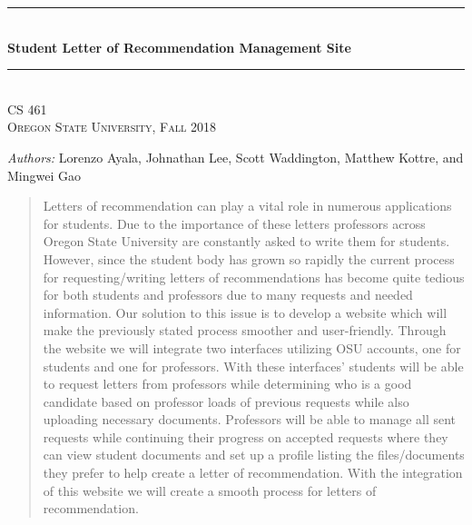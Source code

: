 \documentclass[onecolumn, draftclsnofoot,10pt, compsoc]{IEEEtran}
\begin{document}
\begin{titlepage}
    \newcommand{\HRule}{\rule{\linewidth}{0.5mm}}
    \center 
    \HRule \\[0.4cm]
    { \Large \bfseries Student Letter of Recommendation Management Site}\\[0.4cm] 
    \HRule \\[0.5cm]
    \center 
    \textsc{\Large CS 461}\\[0.5cm] 
    \textsc{\Large Oregon State University, Fall 2018}\\[0.5cm] 
    \begin{minipage}{0.4\textwidth}
        \begin{center} \large
        \emph{Authors:} Lorenzo Ayala, Johnathan Lee, Scott Waddington, Matthew Kottre, and Mingwei Gao
        \end{center}
    \end{minipage}
    \vspace{2cm}
    \begin{abstract}
   Letters of recommendation can play a vital role in numerous applications for students. Due to the importance of these letters professors across Oregon State University are constantly asked to write them for students. However, since the student body has grown so rapidly the current process for requesting/writing letters of recommendations has become quite tedious for both students and professors due to many requests and needed information.  Our solution to this issue is to develop a website which will make the previously stated process smoother and user-friendly. Through the website we will integrate two interfaces utilizing OSU accounts, one for students and one for professors. With these interfaces’ students will be able to request letters from professors while determining who is a good candidate based on professor loads of previous requests while also uploading necessary documents. Professors will be able to manage all sent requests while continuing their progress on accepted requests where they can view student documents and set up a profile listing the files/documents they prefer to help create a letter of recommendation. With the integration of this website we will create a smooth process for letters of recommendation. 
    \end{abstract}
    \vfill %
\end{titlepage}
\newpage
{}

\center
\end{document}

